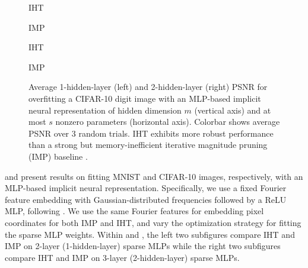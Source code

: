 \documentclass{article} %
\newcommand{\1}{\ensuremath{{\sf (i)}}}
\newcommand{\2}{\ensuremath{{\sf (ii)}}}
\newcommand{\3}{\ensuremath{{\sf (iii)}}}
\newcommand{\4}{\ensuremath{{\sf (iv)}}}
\newcommand{\5}{\ensuremath{{\sf (v)}}}
\newcommand{\6}{\ensuremath{{\sf (vi)}}}
\begin{document}
\begin{figure}[ht]
    \centering
    \begin{minipage}{0.24\textwidth}
    \centering
    IHT
    \end{minipage}
    \begin{minipage}{0.24\textwidth}
    \centering
        IMP
    \end{minipage}
    \centering
    \begin{minipage}{0.24\textwidth}
    \centering
    IHT
    \end{minipage}
    \begin{minipage}{0.24\textwidth}
    \centering
        IMP
    \end{minipage}
    \caption{Average 1-hidden-layer (left) and 2-hidden-layer (right) PSNR for overfitting a CIFAR-10 digit image with an MLP-based implicit neural representation \citep{tancik2020fourfeat} of hidden dimension $m$ (vertical axis) and at most $s$ nonzero parameters (horizontal axis). Colorbar shows average PSNR over 3 random trials. IHT exhibits more robust performance than a strong but memory-inefficient iterative magnitude pruning (IMP) baseline \citep{frankle2018lottery}.}
    \label{fig:inr_cifar}
\end{figure}

 and  present results on fitting MNIST and CIFAR-10 images, respectively, with an MLP-based implicit neural representation. Specifically, we use a fixed Fourier feature embedding with Gaussian-distributed frequencies followed by a ReLU MLP, following \citet{tancik2020fourfeat}. We use the same Fourier features for embedding pixel coordinates for both IMP and IHT, and vary the optimization strategy for fitting the sparse MLP weights. Within  and , the left two subfigures compare IHT and IMP on 2-layer (1-hidden-layer) sparse MLPs while the right two subfigures compare IHT and IMP on 3-layer (2-hidden-layer) sparse MLPs. 
\end{document}
